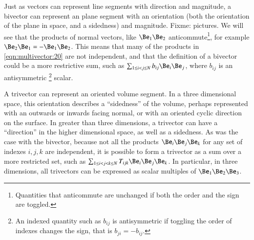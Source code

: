 Just as vectors can represent line segments with direction and magnitude, a bivector can represent an plane segment with an orientation (both the orientation of the plane in space, and a sidedness) and magnitude.
Fixme: pictures.
We will see that the products of normal vectors, like \( \Be_1 \Be_2 \) anticommute\footnote{Quantities that anticommute are unchanged if both the order and the sign are toggled.},
for example \( \Be_2 \Be_1 = -\Be_1 \Be_2 \).
This means that many of the products in \cref{eqn:multivector:20} are not independent, and that the definition of a bivector could be a more restrictive sum, such as \( \sum_{1 \le i < j \le N} b_{ij} \Be_i \Be_j \), where \( b_{ij} \) is an antisymmetric
\footnote{An indexed quantity such as \( b_{ij} \) is antisymmetric if toggling the order of indexes changes the sign, that is \( b_{ji} = -b_{ij} \).}
scalar.


A trivector can represent an oriented volume segment.
In a three dimensional space, this orientation describes a ``sidedness'' of the volume, perhaps represented with an outwards or inwards facing normal, or with an oriented cyclic direction on the surface.
In greater than three dimensions, a trivector can have a ``direction'' in the higher dimensional space, as well as a sidedness.
As was the case with the bivector, because not all the products \( \Be_i \Be_j \Be_k \) for any set of indexes \( i, j, k \) are independent, it is possible to form a trivector as a sum over a more restricted set, such as \( \sum_{1 \le i < j < k \le N} T_{ijk} \Be_i \Be_j \Be_k \).
In particular, in three dimensions, all trivectors can be expressed as scalar multiples of \( \Be_1 \Be_2 \Be_3 \).


